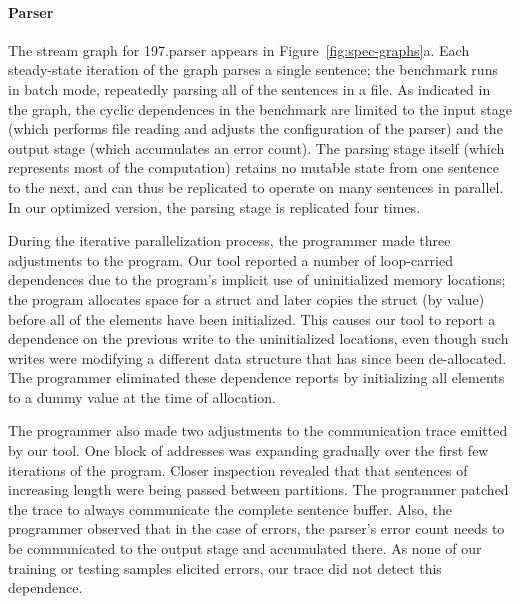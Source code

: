 
\paragraph*{Parser} The stream graph for 197.parser appears in
Figure~\ref{fig:spec-graphs}a.  Each steady-state iteration of the
graph parses a single sentence; the benchmark runs in batch mode,
repeatedly parsing all of the sentences in a file.  As indicated in
the graph, the cyclic dependences in the benchmark are limited to the
input stage (which performs file reading and adjusts the configuration
of the parser) and the output stage (which accumulates an error
count).  The parsing stage itself (which represents most of the
computation) retains no mutable state from one sentence to the next,
and can thus be replicated to operate on many sentences in parallel.
In our optimized version, the parsing stage is replicated four times.

During the iterative parallelization process, the programmer made
three adjustments to the program.  Our tool reported a number of
loop-carried dependences due to the program's implicit use of
uninitialized memory locations; the program allocates space for a
struct and later copies the struct (by value) before all of the
elements have been initialized.  This causes our tool to report a
dependence on the previous write to the uninitialized locations, even
though such writes were modifying a different data structure that has
since been de-allocated.  The programmer eliminated these dependence
reports by initializing all elements to a dummy value at the time of
allocation.

The programmer also made two adjustments to the communication trace
emitted by our tool.  One block of addresses was expanding gradually
over the first few iterations of the program.  Closer inspection
revealed that that sentences of increasing length were being passed
between partitions.  The programmer patched the trace to always
communicate the complete sentence buffer.
Also, the programmer observed that in the case of errors, the parser's
error count needs to be communicated to the output stage and
accumulated there.  As none of our training or testing samples
elicited errors, our trace did not detect this dependence.

